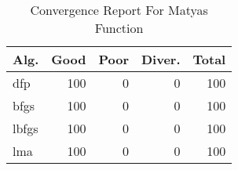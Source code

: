 \begin{table}
\centering
\caption{Convergence Report For Matyas Function}
\label{convergence:matyas}
\begin{tabular}{lrrrr}
\toprule
 Alg. &  Good &  Poor &  Diver. &  Total \\
\midrule
  dfp &   100 &     0 &       0 &    100 \\
 bfgs &   100 &     0 &       0 &    100 \\
lbfgs &   100 &     0 &       0 &    100 \\
  lma &   100 &     0 &       0 &    100 \\
\bottomrule
\end{tabular}
\end{table}
